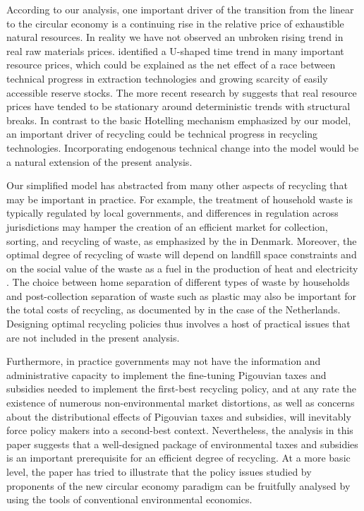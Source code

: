 According to our analysis, one important driver of the transition from the linear to the circular economy is a continuing rise in the relative price of exhaustible natural resources. In reality we have not observed an unbroken rising trend in real raw materials prices. \textcite{slade1982} identified a U-shaped time trend in many important resource prices, which could be explained as the net effect of a race between technical progress in extraction technologies and growing scarcity of easily accessible reserve stocks. The more recent research by \textcite{lee2006} suggests that real resource prices have tended to be stationary around deterministic trends with structural breaks. In contrast to the basic Hotelling mechanism emphasized by our model, an important driver of recycling could be technical progress in recycling technologies. Incorporating endogenous technical change into the model would be a natural extension of the present analysis.

Our simplified model has abstracted from many other aspects of recycling that may be important in practice. For example, the treatment of household waste is typically regulated by local governments, and differences in regulation across jurisdictions may hamper the creation of an efficient market for collection, sorting, and recycling of waste, as emphasized by the \textcite{advisoryboard2017} in Denmark. Moreover, the optimal degree of recycling of waste will depend on landfill space constraints \parencite{highfill1997} and on the social value of the waste as a fuel in the production of heat and electricity \parencite{gradus2017}. The choice between home separation of different types of waste by households and post-collection separation of waste such as plastic may also be important for the total costs of recycling, as documented by \textcite{dijkgraaf2017} in the case of the Netherlands. Designing optimal recycling policies thus involves a host of practical issues that are not included in the present analysis.

Furthermore, in practice governments may not have the information and administrative capacity to implement the fine-tuning Pigouvian taxes and subsidies needed to implement the first-best recycling policy, and at any rate the existence of numerous non-environmental market distortions, as well as concerns about the distributional effects of Pigouvian taxes and subsidies, will inevitably force policy makers into a second-best context. Nevertheless, the analysis in this paper suggests that a well-designed package of environmental taxes and subsidies is an important prerequisite for an efficient degree of recycling. At a more basic level, the paper has tried to illustrate that the policy issues studied by proponents of the new circular economy paradigm can be fruitfully analysed by using the tools of conventional environmental economics.
